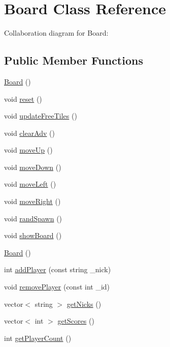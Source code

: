 \hypertarget{classBoard}{\section{Board Class Reference}
\label{classBoard}
}


Collaboration diagram for Board\-:
\subsection*{Public Member Functions}
\begin{DoxyCompactItemize}
\item 
\hyperlink{classBoard_a9ee491d4fea680cf69b033374a9fdfcb}{Board} ()
\item 
void \hyperlink{classBoard_aaef819a8d1a10c35d9f802195802236e}{reset} ()
\item 
void \hyperlink{classBoard_afcd4fcf5cbe57ff612f43a3fcb9a336f}{update\-Free\-Tiles} ()
\item 
void \hyperlink{classBoard_a43d0ddf4bb8fb210425cb3e3d335ee91}{clear\-Adv} ()
\item 
void \hyperlink{classBoard_a767dee32f9ceb1f7d83bdd75e4b3564b}{move\-Up} ()
\item 
void \hyperlink{classBoard_a37e2291db8ee17dd063bc858e97043d4}{move\-Down} ()
\item 
void \hyperlink{classBoard_a331b8563869f8ddd6a086f7b254f91ba}{move\-Left} ()
\item 
void \hyperlink{classBoard_a9587b11000f09b594bc005f85354fa70}{move\-Right} ()
\item 
void \hyperlink{classBoard_a292092da6bf7e9d034a253b8badb29ec}{rand\-Spawn} ()
\item 
void \hyperlink{classBoard_a4c7d8fa323cbc2163d9375bbf52e8b07}{show\-Board} ()
\item 
\hyperlink{classBoard_a9ee491d4fea680cf69b033374a9fdfcb}{Board} ()
\item 
int \hyperlink{classBoard_aa8719dadd43fede6c8e8c904c2c472a7}{add\-Player} (const string \-\_\-nick)
\item 
void \hyperlink{classBoard_ae9693e44c8659fe473d303ec59c8dcf2}{remove\-Player} (const int \-\_\-id)
\item 
vector$<$ string $>$ \hyperlink{classBoard_acb2805f463ec6811a418eeec6614159f}{get\-Nicks} ()
\item 
vector$<$ int $>$ \hyperlink{classBoard_a22c26cd978ed6b28a855c8233fc45bde}{get\-Scores} ()
\item 
int \hyperlink{classBoard_a61e7c035becfc6e8b3ae38c3e417792a}{get\-Player\-Count} ()

\end{DoxyCompactItemize}
